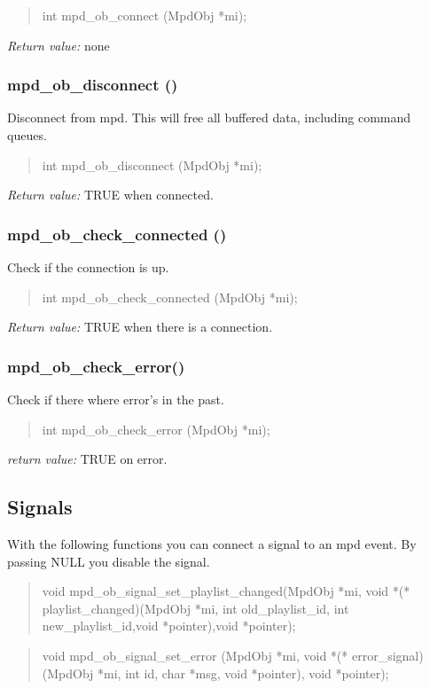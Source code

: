 \documentclass[a4paper,11pt]{article}
\begin{document}
 \begin{quote}
 int mpd\_ob\_connect (MpdObj *mi); 
 \end{quote}
 \textit{Return value:} none
 \subsubsection{mpd\_ob\_disconnect ()}
 Disconnect from mpd. This will free all buffered data, including command queues.
 \begin{quote}
 int mpd\_ob\_disconnect (MpdObj *mi);
 \end{quote}
 \textit{Return value:} TRUE when connected.
 \subsubsection{mpd\_ob\_check\_connected ()}
 Check if the connection is up.
 \begin{quote}
 int mpd\_ob\_check\_connected (MpdObj *mi); 
 \end{quote}
 \textit{Return value:} TRUE when there is a connection.
 \subsubsection{mpd\_ob\_check\_error()}
 Check if there where error's in the past.
 \begin{quote}
 int mpd\_ob\_check\_error (MpdObj *mi);
 \end{quote}
 \textit{return value:} TRUE on error.
 
 
 
 
 \subsection{Signals}
 
	With the following functions you can connect a signal to an mpd event. By passing NULL you disable the signal.\\
	
	\begin{quote}
	void mpd\_ob\_signal\_set\_playlist\_changed(MpdObj *mi, void *(* playlist\_changed)(MpdObj *mi, int old\_playlist\_id, int new\_playlist\_id,void *pointer),void *pointer);
	\end{quote}
	
	\begin{quote}
	void   mpd\_ob\_signal\_set\_error   
	(MpdObj *mi, void *(* error\_signal)(MpdObj *mi, int id, char *msg, void *pointer),
	void *pointer);
	\end{quote}
	
\end{document}
